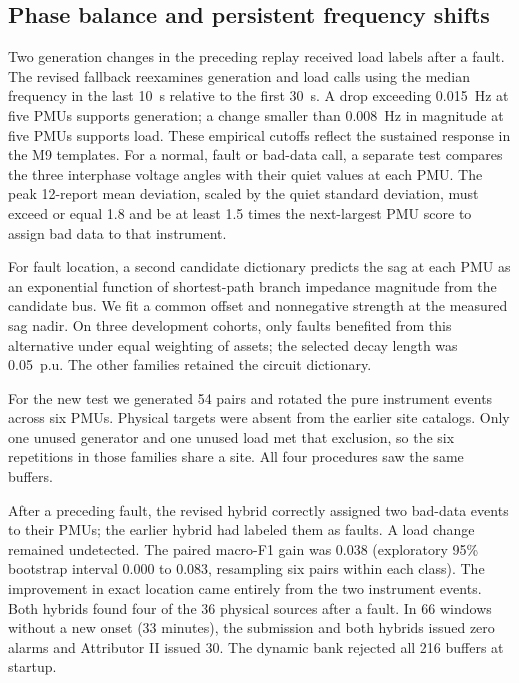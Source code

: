 \subsection{Phase balance and persistent frequency shifts}
Two generation changes in the preceding replay received load labels
after a fault. The revised fallback reexamines generation and load calls
using the median frequency in the last 10~s relative to the first 30~s.
A drop exceeding 0.015~Hz at five PMUs supports generation; a change
smaller than 0.008~Hz in magnitude at five PMUs supports load. These
empirical cutoffs reflect the sustained response in the M9 templates.
For a normal, fault or bad-data call, a separate test compares the
three interphase voltage angles with their quiet values at each PMU.
The peak 12-report mean deviation, scaled by the quiet standard
deviation, must exceed or equal 1.8 and be at least 1.5 times the
next-largest PMU score to assign bad data to that instrument.

For fault location, a second candidate dictionary predicts the sag
at each PMU as an exponential function of shortest-path branch
impedance magnitude from the candidate bus. We fit a common offset
and nonnegative strength at the measured sag nadir. On three
development cohorts, only faults benefited from this alternative
under equal weighting of assets; the selected decay length was
0.05~p.u. The other families retained the circuit dictionary.

For the new test we generated 54 pairs and rotated the pure
instrument events across six PMUs. Physical targets were absent
from the earlier site catalogs. Only one unused generator and one
unused load met that exclusion, so the six repetitions in those
families share a site. All four procedures saw the same buffers.

\begin{table}[!ht]\centering\small
\caption{New eight-PMU replay. Each condition has 54 family decisions,
48 events and 36 events with a physical source. Source counts require
an exact site; sensitivity counts any positive event decision.}
\label{tab:m9-successor}
\setlength{\tabcolsep}{3pt}

\end{table}

After a preceding fault, the revised hybrid correctly assigned two
bad-data events to their PMUs; the earlier hybrid had labeled them
as faults. A load change remained undetected. The paired macro-F1
gain was 0.038 (exploratory 95\% bootstrap interval 0.000 to 0.083,
resampling six pairs within each class). The improvement in exact
location came entirely from the two instrument events. Both hybrids
found four of the 36 physical sources after a fault. In 66 windows
without a new onset (33 minutes), the submission and both hybrids
issued zero alarms and Attributor II issued 30. The dynamic bank
rejected all 216 buffers at startup.

